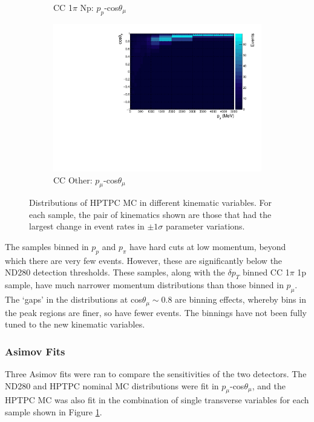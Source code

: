 \begin{figure}
\begin{subfigure}{.49\textwidth}
  \caption{CC 1$\pi$ Np: $p_{p}$-cos$\theta_{\mu}$}
\end{subfigure}
\begin{subfigure}{.49\textwidth}
  \centering
  \includegraphics[width=0.9\linewidth]{figs/hptpc_sigvar_ccOther.pdf}
  \caption{CC Other: $p_{\mu}$-cos$\theta_{\mu}$}
\end{subfigure}
\caption{Distributions of HPTPC MC in different kinematic variables. For each sample, the pair of kinematics shown are those that had the largest change in event rates in $\pm1\sigma$ parameter variations.}
\label{fig:hptpcsigvar}
\end{figure}

The samples binned in $p_{p}$ and $p_{\pi}$ have hard cuts at low momentum, beyond which there are very few events. However, these are significantly below the ND280 detection thresholds. These samples, along with the $\delta p_{T}$ binned CC 1$\pi$ 1p  sample, have much narrower momentum distributions than those binned in $p_{\mu}$. The `gaps' in the distributions at cos$\theta_{\mu}\sim0.8$ are binning effects, whereby bins in the peak regions are finer, so have fewer events. The binnings have not been fully tuned to the new kinematic variables. 

\subsubsection{Asimov Fits}

Three Asimov fits were ran to compare the sensitivities of the two detectors. The ND280 and HPTPC nominal MC distributions were fit in $p_{\mu}$-cos$\theta_{\mu}$, and the HPTPC MC was also fit in the combination of single transverse variables for each sample shown in Figure \ref{fig:hptpcsigvar}.

